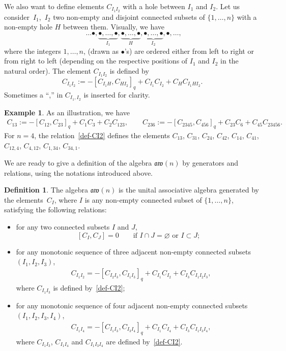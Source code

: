 \documentclass[pdftex]{sigma}
\numberwithin{equation}{section}
\theoremstyle{definition}
\newtheorem{defi}[theo]{Definition}
\newtheorem{exam}[theo]{Example}
\newcommand{\aw}{\mathfrak{aw}(n)}
\begin{document}
We also want to define elements $C_{I_1I_2}$ with a hole between $I_1$ and $I_2$.
Let us consider~$I_1$,~$I_2$ two non-empty and disjoint connected subsets of $\{1,\dots,n\}$ with a non-empty hole $H$ between them. Visually, we have
\[\ \ \ldots \bullet,\underbrace{\bullet,\dots,\bullet}_{I_1},\underbrace{\bullet,\dots,\bullet}_{H},\underbrace{\bullet,\dots,\bullet}_{I_2},\bullet,\ldots, \]
where the integers $1,\dots,n$, (drawn as $\bullet$'s) are ordered either from left to right or from right to left
(depending on the respective positions of $I_1$ and $I_2$ in the natural order). The element $C_{I_1I_2}$ is defined by
\begin{equation}\label{def-CI2}
C_{I_1I_2}:=-[C_{I_1H},C_{HI_2}]_q+C_{I_1}C_{I_2}+C_{H}C_{I_1HI_2}.
\end{equation}
Sometimes a ``,'' in $C_{I_1,I_2}$ is inserted for clarity.
\begin{exam}%
As an illustration, we have
\begin{gather*}
 C_{13} :=-[C_{12},C_{23}]_q+C_1C_3+C_2C_{123} ,\qquad
 C_{236} :=-[C_{2345},C_{456}]_q+C_{23}C_6+C_{45}C_{23456} .
\end{gather*}
For $n=4$, the relation~\eqref{def-CI2} defines the elements $C_{13}$, $C_{31}$, $C_{24}$, $C_{42}$, $C_{14}$, $C_{41}$, $C_{12,4}$, $C_{4,12}$, $C_{1,34}$, $C_{34,1}$.
\end{exam}
We are ready to give a definition of the algebra $\aw$ by generators and relations, using the notations introduced above.
\begin{defi}\label{prop:def-nico2}
The algebra $\aw$ is the unital associative algebra generated by the ele\-ments~$C_I$, where $I$ is any non-empty connected subset of $\{1,\dots,n\}$,
satisfying the following relations:
\begin{itemize}\itemsep=0pt
\item for any two connected subsets $I$ and $J$,
\begin{equation}\label{relcommv}
 [C_I,C_J]=0\qquad \text{if $I\cap J=\varnothing$ or $I\subset J$;}
\end{equation}

\item for any monotonic sequence of three adjacent non-empty connected subsets $(I_1,I_2,I_3)$,
\begin{align}
 & C_{I_1I_2}=-[C_{I_2I_3},C_{I_1I_3}]_q+C_{I_1}C_{I_2}+C_{I_3}C_{I_1I_2I_3} , \label{relaw31v}
\end{align}
where $C_{I_1I_3}$ is defined by~\eqref{def-CI2};

\item for any monotonic sequence of four adjacent non-empty connected subsets $(I_1,I_2,I_3,I_4)$,
\begin{align}
 & C_{I_1I_4}=-[C_{I_1I_3},C_{I_3I_4}]_q+C_{I_1}C_{I_4}+C_{I_3}C_{I_1I_3I_4} ,\label{relaw41v}
\end{align}
where $C_{I_1I_3}$, $C_{I_1I_4}$ and $C_{I_1I_3I_4}$ are defined by~\eqref{def-CI2}.
\end{itemize}
\end{defi}
\end{document}
